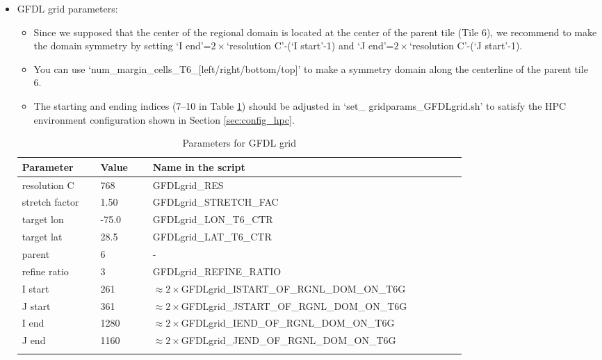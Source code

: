 \documentclass[11pt,fleqn]{report}              %
\begin{document}
\begin{enumerate}
\begin{itemize}
\item GFDL grid parameters:

\begin{itemize}
\item Since we supposed that the center of the regional domain is located at the center of the parent tile (Tile 6), we recommend to make the domain symmetry by setting `I end'=$2\times$`resolution C'-(`I start'-1) and `J end'=$2\times$`resolution C'-(`J start'-1).
\item You can use `num\_margin\_cells\_T6\_[left/right/bottom/top]' to make a symmetry domain along the centerline of the parent tile 6.
\item The starting and ending indices (7--10 in Table \ref{table:var_ecoast_gfdl}) should be adjusted in `set\_ gridparams\_GFDLgrid.sh' to satisfy the HPC environment configuration shown in Section \ref{sec:config_hpc}.
\end{itemize}

{
\fontsize{10}{12}\selectfont
\begin{longtable}{ p{0.15\linewidth} | p{0.1\linewidth} | p{0.6\linewidth}  }
\hline
\hline
 Parameter & Value & Name in the script \\
\hline
 resolution C & 768 & GFDLgrid\_RES \\
 stretch factor & 1.50 & GFDLgrid\_STRETCH\_FAC  \\
 target lon & -75.0 & GFDLgrid\_LON\_T6\_CTR \\ 
 target lat & 28.5 & GFDLgrid\_LAT\_T6\_CTR \\
 parent & 6 & - \\
 refine ratio & 3 & GFDLgrid\_REFINE\_RATIO \\
 I start & 261 & $\approx 2\times$GFDLgrid\_ISTART\_OF\_RGNL\_DOM\_ON\_T6G \\
 J start & 361 & $\approx 2\times$GFDLgrid\_JSTART\_OF\_RGNL\_DOM\_ON\_T6G \\
 I end & 1280 & $\approx 2\times$GFDLgrid\_IEND\_OF\_RGNL\_DOM\_ON\_T6G \\
 J end & 1160 & $\approx 2\times$GFDLgrid\_JEND\_OF\_RGNL\_DOM\_ON\_T6G \\
\hline
\caption{Parameters for GFDL grid}
\label{table:var_ecoast_gfdl}
\end{longtable}
}


\end{itemize}
\end{enumerate}
\end{document}
